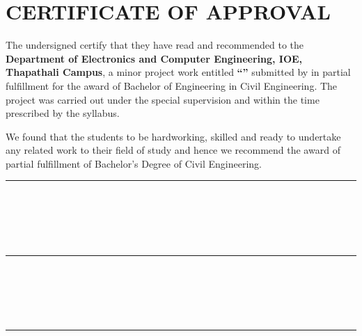 \chapter*{CERTIFICATE OF APPROVAL}
{}

\noindent The undersigned certify that they have read and recommended to the
\textbf{Department of Electronics and Computer Engineering, IOE, Thapathali Campus},
a minor project work entitled \textbf{``\cTitle''} submitted by
\textbf{\authorList} in partial fulfillment for the award of Bachelor of
Engineering in Civil Engineering.
The project was carried out under the special supervision and within the time
prescribed by the syllabus.

\vspace{1em}

We found that the students to be hardworking, skilled and ready to undertake
any related work to their field of study and hence we recommend the award of
partial fulfillment of Bachelor's Degree of Civil Engineering.

\vspace{2em}

\noindent
\begin{minipage}[t]{0.48\textwidth}
    \rule{6cm}{0.2mm} \\
    \cSupervisorTitle \\
    \cSupervisor \\
    \cSupervisorDept \\
    \cSupervisorAddress
\end{minipage}
\hfill
\begin{minipage}[t]{0.48\textwidth}
    \rule{6cm}{0.2mm} \\
    \cExternalExaminerTitle \\
    \cExternalExaminer \\
    \cExternalExaminerDept \\
    \cExternalExaminerAddress
\end{minipage}

\vspace{3em}


\noindent
\begin{minipage}[t]{0.48\textwidth}
    \rule{6cm}{0.2mm} \\
    \cHODTitle \\
    \cHOD \\
    \cHODDept \\
    \cHODAddress
\end{minipage}

\vspace{2em}

\noindent\cDate
